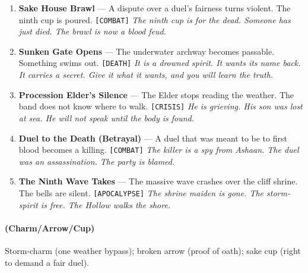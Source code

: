 \begin{enumerate}
\item {} \textbf{Sake House Brawl} --- A dispute over a duel's fairness turns violent. The ninth cup is poured. \texttt{[COMBAT]}
  \hfill \textit{The ninth cup is for the dead. Someone has just died. The brawl is now a blood feud.}
\item {} \textbf{Sunken Gate Opens} --- The underwater archway becomes passable. Something swims out. \texttt{[DEATH]}
  \hfill \textit{It is a drowned spirit. It wants its name back. It carries a secret. Give it what it wants, and you will learn the truth.}
\item {} \textbf{Procession Elder's Silence} --- The Elder stops reading the weather. The band does not know where to walk. \texttt{[CRISIS]}
  \hfill \textit{He is grieving. His son was lost at sea. He will not speak until the body is found.}
\item {} \textbf{Duel to the Death (Betrayal)} --- A duel that was meant to be to first blood becomes a killing. \texttt{[COMBAT]}
  \hfill \textit{The killer is a spy from Ashaan. The duel was an assassination. The party is blamed.}
\item {} \textbf{The Ninth Wave Takes} --- The massive wave crashes over the cliff shrine. The bells are silent. \texttt{[APOCALYPSE]}
  \hfill \textit{The shrine maiden is gone. The storm-spirit is free. The Hollow walks the shore.}
\end{enumerate}

\paragraph*{(Charm/Arrow/Cup)} Storm-charm (one weather bypass); broken arrow (proof of oath); sake cup (right to demand a fair duel).

